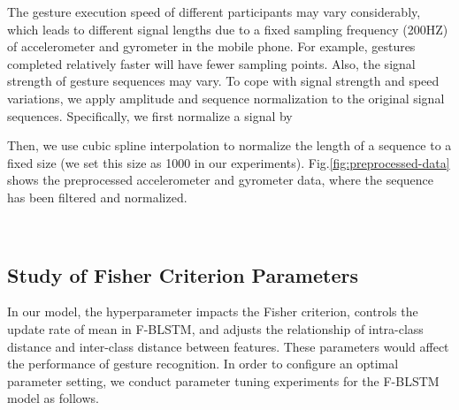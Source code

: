 \documentclass[review]{elsarticle}
\begin{document}
The gesture execution speed of different participants may vary considerably, which leads to different signal lengths due to a fixed sampling frequency (200HZ) of accelerometer and gyrometer in the mobile phone. For example, gestures completed relatively faster will have fewer sampling points. Also, the signal strength of gesture sequences may vary. To cope with signal strength and speed variations, we apply amplitude and sequence normalization to the original signal sequences. Specifically, we first normalize a signal  by

Then, we use cubic spline interpolation to normalize the length of a sequence to a fixed size (we set this size as 1000 in our experiments). Fig.\;\ref{fig:preprocessed-data} shows the preprocessed accelerometer and gyrometer data, where the sequence has been filtered and normalized.
\begin{figure*}[htbp]
	\normalsize
	\centering
	\\
	\caption{The preprocessed accelerometer and gyrometer data.}
	\label{fig:preprocessed-data}
	\vspace*{4pt}
\end{figure*}

\subsection{Study of Fisher Criterion Parameters}\label{sec:parameter}

In our model, the hyperparameter  impacts the Fisher criterion,  controls the update rate of mean  in F-BLSTM, and  adjusts the relationship of intra-class distance and inter-class distance between features. These parameters would affect the performance of gesture recognition. In order to configure an optimal parameter setting, we conduct parameter tuning experiments for the F-BLSTM model as follows.
\end{document}
